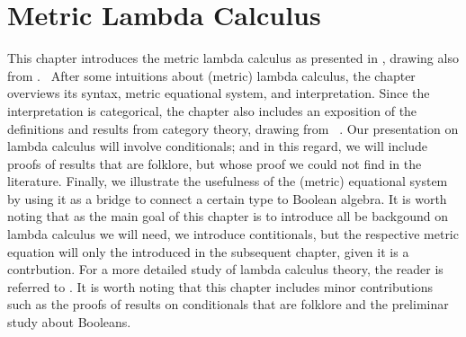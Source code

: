 


  


   



















\chapter{Metric Lambda Calculus} \label{ch:metriclambda}




This chapter introduces the metric lambda calculus as presented in \cite{dahlqvist2023syntactic}, drawing also from \cite{mackieLanguageAutonomous1993,croleCategoriesTypes1994,selinger2013lecture}.  After some intuitions about (metric) lambda calculus, the chapter overviews its syntax, metric equational system, and interpretation. Since the interpretation is categorical, the chapter also includes an exposition of the definitions and results from category theory, drawing from  \cite{yanofskyMonoidalCategoryTheory2024,barrCategoryTheoryComputing1990,maclane13}. Our presentation on lambda calculus will involve conditionals; and in this regard, we will include proofs of results that are folklore, but whose proof we could not find in the literature. Finally, we illustrate the usefulness of the (metric) equational system by using it as a bridge to connect a certain type to Boolean algebra. It is worth noting that as the main goal of this chapter is to introduce all be backgound on lambda calculus we will need, we introduce contitionals, but the respective metric equation will only the introduced in the subsequent chapter, given it is a contrbution. 
For a more detailed study of lambda calculus theory, the reader is referred to \eg \cite{barendregt1984lambda}. It is worth noting that this chapter includes minor contributions such as the proofs of results on conditionals that are folklore and the preliminar study about Booleans.

